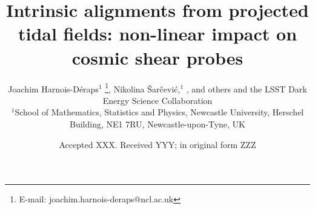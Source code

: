 \documentclass[useAMS,usenatbib]{mn2e}
\title[Lensing beyond 2pt: accounting for IA]{Intrinsic alignments from projected tidal fields: non-linear  impact on cosmic shear probes}
\author[J. Harnois-D\'{e}raps et al.]{Joachim Harnois-D\'{e}raps$^{1}$
\orcidlink{0000-0002-4864-1240}
\thanks{E-mail: joachim.harnois-deraps@ncl.ac.uk},
Nikolina \v{S}ar\v{c}evi\'c,$^{1}$
\orcidlink{0000-0001-7301-6415},
and others
\newauthor
and the LSST Dark Energy Science Collaboration
\\
$^{1}$School of Mathematics, Statistics and Physics, Newcastle University, Herschel Building, NE1 7RU, Newcastle-upon-Tyne, UK\\
}
\date{Accepted XXX. Received YYY; in original form ZZZ}
\begin{document}
\label{firstpage}
\maketitle





 










%

 




\bsp	%
\label{lastpage}
\end{document}
